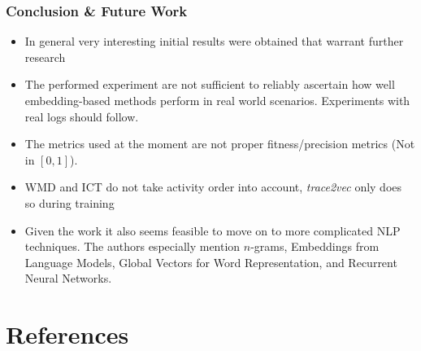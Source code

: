 \documentclass{beamer}
\begin{document}
\begin{frame}
	\frametitle{Conclusion \& Future Work}
	\begin{itemize}
		\item In general very interesting initial results were obtained that warrant further research
		\item The performed experiment are not sufficient to reliably ascertain how well embedding-based methods perform in real world scenarios. Experiments with real logs should follow.
		\item The metrics used at the moment are not proper fitness/precision metrics (Not in $[0,1]$).
		\item WMD and ICT do not take activity order into account, \emph{trace2vec} only does so during training
		\item Given the work it also seems feasible to move on to more complicated NLP techniques. The authors especially mention $n$-grams, Embeddings from Language Models, Global Vectors for Word Representation, and Recurrent Neural Networks.
	\end{itemize}
\end{frame}

\section*{References}
\begin{frame}[allowframebreaks]
	
	
\end{frame}
	
\end{document}
